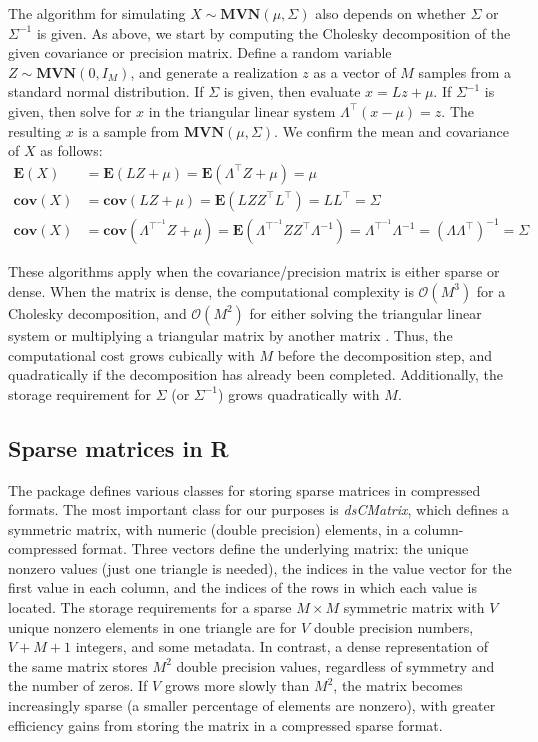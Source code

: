 \documentclass[codesnippet]{jss}\usepackage[]{graphicx}\usepackage[]{color}
\newcommand{\class}[1]{\textsl{#1}}
\newcommand{\EV}[1]{\mathbf{E}\!\left(#1\right)}
\newcommand{\Cov}[1]{\mathbf{cov}\!\left(#1\right)}
\newcommand{\MVN}[1]{\mathbf{MVN}\!\left(#1\right)}
\newcommand{\bigO}[1]{\mathcal{O}\!\left(#1\right)}
\begin{document}
The algorithm for simulating  $X\sim\MVN{\mu,\Sigma}$ also
depends on whether
$\Sigma$ or $\Sigma^{-1}$ is given.  As above, we start by computing
the Cholesky decomposition of the given covariance or precision
matrix. Define a random variable $Z\sim\MVN{0,I_M}$, and generate a realization
$z$ as a vector of $M$ samples from a standard normal distribution.  If $\Sigma$ is given,
then evaluate $x=Lz+\mu$.  If $\Sigma^{-1}$ is given, then solve for $x$ in the
triangular linear system $\Lambda^\top\left(x-\mu\right)=z$. The
resulting $x$ is a sample from $\MVN{\mu,\Sigma}$.  We confirm the
mean and covariance of $X$ as follows:
 \begin{align}
 \EV{X}&=\EV{LZ+\mu}=\EV{\Lambda^\top Z+\mu}=\mu\\
   \Cov{X}&= \Cov{LZ+\mu}=\EV{LZZ^\top L^\top}=LL^\top=\Sigma\\
     \Cov{X}&=\Cov{\Lambda^{\top^{-1}}Z+\mu}=\EV{\Lambda^{\top^{-1}}ZZ^\top\Lambda^{-1}}
     =\Lambda^{\top^{-1}}\Lambda^{-1}=(\Lambda\Lambda^\top)^{-1}=\Sigma
 \end{align}

These algorithms apply when the covariance/precision matrix is either
sparse or dense.  When the matrix is dense, the computational
complexity is $\bigO{M^3}$  for a Cholesky decomposition, and
$\bigO{M^2}$ for either solving the triangular linear
system or multiplying a triangular matrix by another matrix
\citep{GolubVanLoan1996}.  Thus, the computational cost grows
cubically with $M$ before the decomposition step, and quadratically if
the decomposition has already been completed.  Additionally, the storage
requirement for $\Sigma$ (or $\Sigma^{-1}$) grows quadratically with $M$.



\subsection{Sparse matrices in R}\label{sec:sparse}

The  package \citep{R_Matrix} defines
various classes for storing sparse matrices in compressed formats. The
most important class for our purposes is
\class{dsCMatrix}, which defines a symmetric matrix, with numeric
(double precision) elements, in a column-compressed format.  Three
vectors define the underlying matrix:
the unique nonzero values (just one triangle is needed), the indices
in the value vector for the first value in each column, and the indices of the rows in
which each value is located. The storage requirements
for a sparse $M\times M$ symmetric matrix with $V$ unique nonzero
elements in one triangle are for $V$ double precision numbers, $V+M+1$ integers, and
some metadata.  In contrast, a dense representation of the same matrix
stores $M^2$ double precision values, regardless of symmetry and the number of
zeros. If $V$ grows more slowly than $M^2$, the matrix becomes
increasingly sparse (a smaller percentage of elements are nonzero),
with greater efficiency gains from storing the matrix in a
compressed sparse format.
\end{document}

